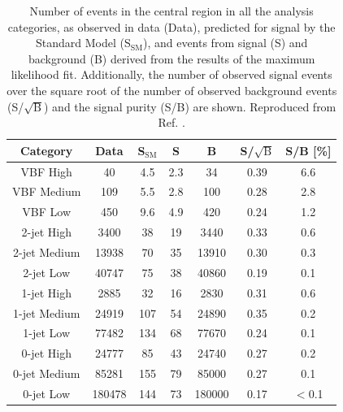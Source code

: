 \begin{table}[htb]
  \centering
  \caption{
  Number of events in the central region in all the analysis categories,
  as observed in data (Data), predicted for signal by the Standard Model
  (S$_\text{SM}$), and events from signal (S) and background (B) derived
  from the results of the maximum likelihood fit. Additionally, the
  number of observed signal events over the square root of the number of
  observed background events (S/$\sqrt{\text{B}}$) and the signal purity
  (S/B) are shown. Reproduced from Ref. \cite{ATLAS-CONF-2019-028}.
  }
  \label{tab:hmumu:results}
  \begin{tabular}{ c c c c c c c }
    \toprule
    \midrule
    Category        & Data     & S$_\text{SM}$  &   S     &    B     & S/$\sqrt{\text{B}}$ & S/B [\%] \\
    \midrule
    VBF High        & 40       &  4.5           &  2.3    & 34       &  0.39               &  6.6 \\
    VBF Medium      & 109      &  5.5           &  2.8    & 100      &  0.28               &  2.8 \\
    VBF Low         & 450      &  9.6           &  4.9    & 420      &  0.24               &  1.2 \\
    2-jet High      & 3400     &    38          &  19     & 3440     &  0.33               &  0.6 \\
    2-jet Medium    & 13938    &    70          &  35     & 13910    &  0.30               &  0.3 \\
    2-jet Low       & 40747    &    75          &  38     & 40860    &  0.19               &  0.1 \\
    1-jet High      & 2885     &    32          &  16     &  2830    &  0.31               &  0.6 \\
    1-jet Medium    & 24919    &  107           &  54     & 24890    &  0.35               &  0.2 \\
    1-jet Low       & 77482    &  134           &  68     & 77670    &  0.24               &  0.1 \\
    0-jet High      & 24777    &  85            &  43     & 24740    &  0.27               &  0.2 \\
    0-jet Medium    & 85281    &  155           &  79     & 85000    &  0.27               &  0.1 \\
    0-jet Low       & 180478   &  144           &  73     & 180000   &  0.17               &  $<$0.1 \\
    \midrule
    \bottomrule
  \end{tabular}
\end{table}

